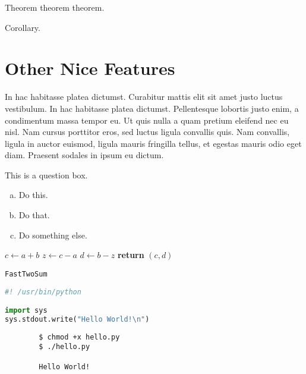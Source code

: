 \documentclass{article}
\begin{document}
\begin{theorem}
Theorem theorem theorem.
\end{theorem}
\begin{cor}
Corollary. 
\end{cor}


\section{Other Nice Features} %

In hac habitasse platea dictumst. Curabitur mattis elit sit amet justo luctus vestibulum. In hac habitasse platea dictumst. Pellentesque lobortis justo enim, a condimentum massa tempor eu. Ut quis nulla a quam pretium eleifend nec eu nisl. Nam cursus porttitor eros, sed luctus ligula convallis quis. Nam convallis, ligula in auctor euismod, ligula mauris fringilla tellus, et egestas mauris odio eget diam. Praesent sodales in ipsum eu dictum.

\begin{question}
	This is a question box.
	\begin{enumerate}[(a)]
		\item Do this.
		\item Do that.
		\item Do something else.
	\end{enumerate}
\end{question}
	
\begin{center}
	\begin{minipage}{0.5\linewidth}
		\begin{algorithm}[H]
			\medskip
			$c \leftarrow a + b$ \;
			$z \leftarrow c - a$ \;
			$d \leftarrow b - z$ \;
			{\bf return} $(c,d)$ \;
			\caption{\texttt{FastTwoSum}} 
			\label{alg:fastTwoSum}  
		\end{algorithm}
	\end{minipage}
\end{center}

\begin{file}[hello.py]
\begin{lstlisting}[language=Python]
#! /usr/bin/python

import sys
sys.stdout.write("Hello World!\n")
\end{lstlisting}
\end{file}

\begin{commandline}
	\begin{verbatim}
		$ chmod +x hello.py
		$ ./hello.py

		Hello World!
	\end{verbatim}
\end{commandline}
\end{document}
